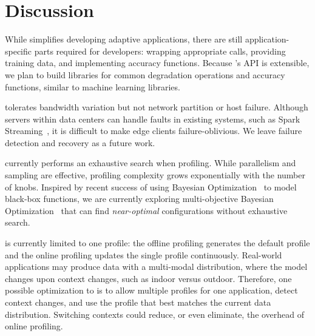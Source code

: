 \section{Discussion}
\label{sec:discussion}

 While \awstream{} simplifies developing
adaptive applications, there are still application-specific parts required for
developers: wrapping appropriate \maybe{} calls, providing training data, and
implementing accuracy functions. Because \awstream{}'s API is extensible, we plan
to build libraries for common degradation operations and accuracy functions,
similar to machine learning libraries.

 \awstream{} tolerates bandwidth variation
but not network partition or host failure. Although servers within data centers
can handle faults in existing systems, such as Spark
Streaming~\cite{zaharia2013discretized}, it is difficult to make edge clients
failure-oblivious.  We leave failure detection and recovery as a future work.

 \awstream{} currently performs an exhaustive search when
profiling. While parallelism and sampling are effective, profiling complexity
grows exponentially with the number of knobs. Inspired by recent success of
using Bayesian Optimization~\cite{snoek2012practical, alipourfard2017cherrypick,
  solnik2017bayesian} to model black-box functions, we are currently exploring
multi-objective Bayesian Optimization~\cite{hernandez2016predictive} that can
find \textit{near-optimal} configurations without exhaustive search.


 \awstream{} is currently limited to one profile: the
offline profiling generates the default profile and the online profiling
updates the single profile continuously.  Real-world applications may produce
data with a multi-modal distribution, where the model changes upon context
changes, such as indoor versus outdoor. Therefore, one possible optimization
to \awstream{} is to allow multiple profiles for one application, detect
context changes, and use the profile that best matches the current data
distribution.  Switching contexts could reduce, or even eliminate, the
overhead of online profiling.

